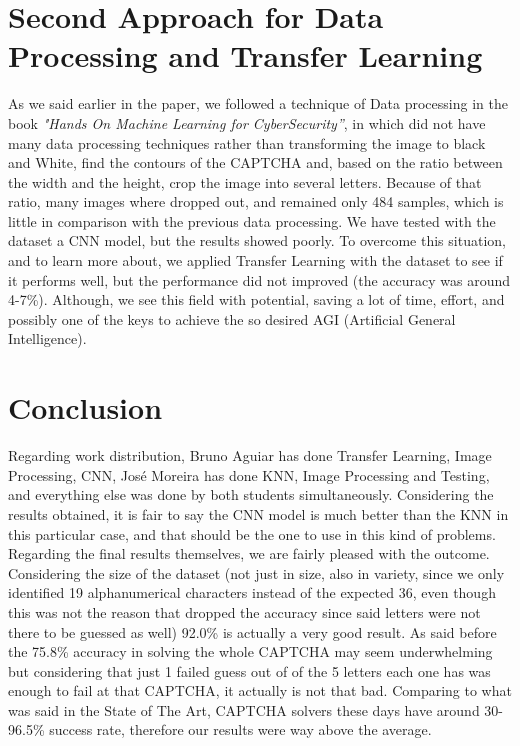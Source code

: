 \documentclass[conference]{IEEEtran}
\begin{document}
\section{Second Approach for Data Processing and Transfer Learning}
As we said earlier in the paper, we followed a technique of Data processing in the book \textit{"Hands On Machine Learning for CyberSecurity”}, in which did not have many data processing techniques rather than transforming the image to black and White, find the contours of the CAPTCHA and, based on the ratio between the width and the height, crop the image into several letters. Because of that ratio, many images where dropped out, and remained only 484 samples, which is little in comparison with the previous data processing. We have tested with the dataset a CNN model, but the results showed poorly. To overcome this situation, and to learn more about, we applied Transfer Learning with the dataset to see if it performs well, but the performance did not improved (the accuracy was around 4-7\%). Although, we see this field with potential, saving a lot of time, effort, and possibly one of the keys to achieve the so desired AGI (Artificial General Intelligence).

\section{Conclusion}
Regarding work distribution, Bruno Aguiar has done Transfer Learning, Image Processing, CNN, José Moreira has done KNN, Image Processing and Testing, and everything else was done by both students simultaneously. Considering the results obtained, it is fair to say the CNN model is much better than the KNN in this particular case, and that should be the one to use in this kind of problems. Regarding the final results themselves, we are fairly pleased with the outcome. Considering the size of the dataset (not just in size, also in variety, since we only identified 19 alphanumerical characters instead of the expected 36, even though this was not the reason that dropped the accuracy since said letters were not there to be guessed as well) 92.0\% is actually a very good result. As said before the 75.8\% accuracy in solving the whole CAPTCHA may seem underwhelming but considering that just 1 failed guess out of of the 5 letters each one has was enough to fail at that CAPTCHA, it actually is not that bad. Comparing to what was said in the State of The Art, CAPTCHA solvers these days have around 30-96.5\% success rate, therefore our results were way above the average. 
\end{document}
